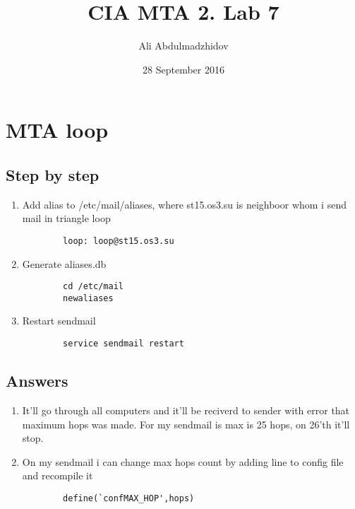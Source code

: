 \documentclass[10pt]{article}
\title{CIA MTA 2. Lab 7}
\date{28 September 2016}
\author{Ali Abdulmadzhidov}
\begin{document}
\renewcommand*\rmdefault{cmss}
  \maketitle
  \section{MTA loop\newline}
  \subsection{Step by step \newline}
  \begin{enumerate}
    \item Add alias to /etc/mail/aliases, where st15.os3.su is neighboor whom i send mail in triangle loop
    \begin{verbatim}
        loop: loop@st15.os3.su
    \end{verbatim}
    \item Generate aliases.db
    \begin{verbatim}
        cd /etc/mail
        newaliases
    \end{verbatim}
    \item Restart sendmail
    \begin{verbatim}
        service sendmail restart
    \end{verbatim}
  \end{enumerate}

  \subsection{Answers \newline}
  \begin{enumerate}
    \item It'll go through all computers and it'll be reciverd to sender with error that maximum hops was made. For my sendmail is max is 25 hops, on 26'th it'll stop.
    \item On my sendmail i can change max hops count by adding line to config file and recompile it
    \begin{verbatim}
        define(`confMAX_HOP',hops)
    \end{verbatim}
  \end{enumerate}
\end{document}
